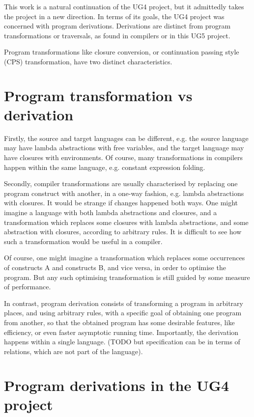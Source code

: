 \documentclass[bsc,frontabs,oneside,singlespacing,parskip,deptreport]{infthesis}
\theoremstyle{definition}
\theoremstyle{lemma}
\begin{document}
This work is a natural continuation of the UG4 project, but it
admittedly takes the project in a new direction. In terms of its
goals, the UG4 project was concerned with program
derivations. Derivations are distinct from program transformations or
traversals, as found in compilers or in this UG5 project.

Program transformations like closure conversion, or continuation
passing style (CPS) transformation, have two distinct characteristics.

\section{Program transformation vs derivation}
\label{sec:progr-transf-vs}

Firstly, the source and target languages can be different, e.g. the
source language may have lambda abstractions with free variables, and
the target language may have closures with environments. Of course,
many transformations in compilers happen within the same language,
e.g. constant expression folding.

Secondly, compiler transformations are usually characterised by
replacing one program construct with another, in a one-way fashion,
e.g. lambda abstractions with closures. It would be strange if changes
happened both ways. One might imagine a language with both lambda
abstractions and closures, and a transformation which replaces some
closures with lambda abstractions, and some abstraction with closures,
according to arbitrary rules. It is difficult to see how such a
transformation would be useful in a compiler.

Of course, one might imagine a transformation which replaces some
occurrences of constructs A and constructs B, and vice versa, in order
to optimise the program. But any such optimising transformation is
still guided by some measure of performance.

In contrast, program derivation consists of transforming a program in
arbitrary places, and using arbitrary rules, with a specific goal of
obtaining one program from another, so that the obtained program has
some desirable features, like efficiency, or even faster asymptotic
running time. Importantly, the derivation happens within a single
language. (TODO but specification can be in terms of relations, which
are not part of the language).

\section{Program derivations in the UG4 project}
\label{sec:progr-deriv-ug4}
\end{document}
